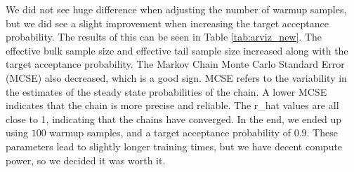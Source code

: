 

\begin{table}[h]
\caption{Arviz results for the lengthscale and variance parameters.}
\label{tab:arviz_new}
\end{table}

We did not see huge difference when adjusting the number of warmup samples, but we did see a slight improvement when increasing the target acceptance probability. The results of this can be seen in Table \ref{tab:arviz_new}. The effective bulk sample size and effective tail sample size increased along with the target acceptance probability. The Markov Chain Monte Carlo Standard Error (MCSE) also decreased, which is a good sign. MCSE refers to the variability in the estimates of the steady state probabilities of the chain. A lower MCSE indicates that the chain is more precise and reliable. The r\_hat values are all close to 1, indicating that the chains have converged. In the end, we ended up using $100$ warmup samples, and a target acceptance probability of $0.9$. These parameters lead to slightly longer training times, but we have decent compute power, so we decided it was worth it.


